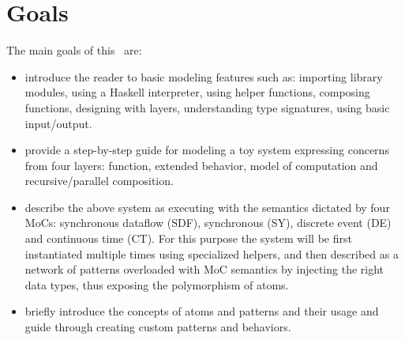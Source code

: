 
\section{Goals}
\label{sec:getting-started:getting-started:goals}

The main goals of this \SelfRef\ are:
\begin{itemize}
\item introduce the reader to basic modeling features such as: importing library modules, using a Haskell interpreter, using helper functions, composing functions, designing with layers, understanding type signatures, using basic input/output.
\item provide a step-by-step guide for modeling a toy system expressing concerns from four layers: function, extended behavior, model of computation and recursive/parallel composition. 
\item describe the above system as executing with the semantics dictated by four MoCs: synchronous dataflow (SDF), synchronous (SY), discrete event (DE) and continuous time (CT). For this purpose the system will be first instantiated multiple times using specialized helpers, and then described as a network of patterns overloaded with MoC semantics by injecting the right data types, thus exposing the polymorphism of atoms. 
\item briefly introduce the concepts of atoms and patterns and their usage and guide through creating custom patterns and behaviors.
\end{itemize}


